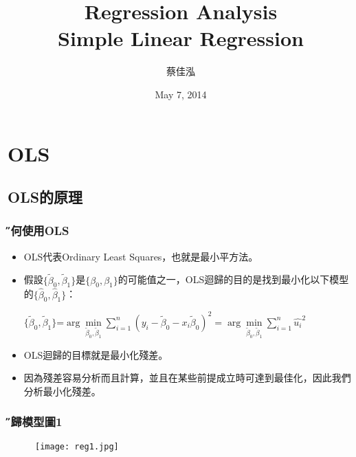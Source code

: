 \documentclass[xcolor=dvipsnames]{beamer}
\author[蔡佳泓]{\K 蔡佳泓}
\title[Statistical Methods for Social Sciences]{Regression Analysis\\
\smallskip
{\small {Simple Linear Regression}}}
\date{May 7, 2014} %
\institute[GIEAS]{\H 國立政治大學東亞所}
\begin{document}
\maketitle
\tableofcontents
\section{OLS}
\subsection{OLS的原理}
\begin{frame} \frametitle{\H 為何使用OLS}
\begin{itemize}
\item OLS代表Ordinary Least Squares，也就是最小平方法。
\item 假設$ \{\tilde{\beta}_{0},\tilde{\beta}_{1}\} $是$ \{\beta_{0},\beta_{1}\} $的可能值之一，OLS迴歸的目的是找到最小化以下模型的$ \{\hat{\beta}_{0},\hat{\beta}_{1}\} $：
\medskip
\begin{center}
$ \{\tilde{\beta}_{0},\tilde{\beta}_{1}\}$=$\arg\min\limits_{{\tilde{\beta}_{0},\tilde{\beta}_{1}}}\sum _{i=1}^n(y_{i}-\tilde{\beta}_{0}-x_{i}\tilde{\beta}_{0})^2 = \arg\min\limits_{{\tilde{\beta}_{0},\tilde{\beta}_{1}}}\sum _{i=1}^n\hat{u_{i}}^2$
\end{center}
\medskip
\item OLS迴歸的目標就是最小化殘差。
\item 因為殘差容易分析而且計算，並且在某些前提成立時可達到最佳化，因此我們分析最小化殘差。
\end{itemize}
\end{frame}
\begin{frame}\frametitle{\H 迴歸模型圖1}
\begin{figure}
\begin{center}
\texttt{[image: reg1.jpg]}
\end{center}
\end{figure}
\end{frame}
\end{document}
